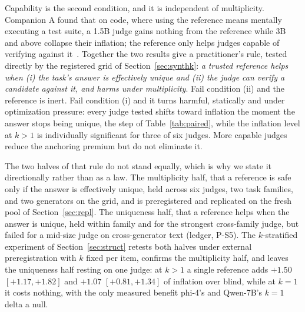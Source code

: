 \documentclass[11pt]{article}
\begin{document}
Capability is the second condition, and it is independent of multiplicity.
Companion A found that on code, where using the reference means mentally executing a test suite, a 1.5B judge gains nothing from the reference while 3B and above collapse their inflation; the reference only helps judges capable of verifying against it~\cite{companionA}.
Together the two results give a practitioner's rule, tested directly by the registered grid of Section~\ref{sec:synthk}: \emph{a trusted reference helps when (i) the task's answer is effectively unique and (ii) the judge can verify a candidate against it, and harms under multiplicity}.
Fail condition (ii) and the reference is inert.
Fail condition (i) and it turns harmful, statically and under optimization pressure: every judge tested shifts toward inflation the moment the answer stops being unique, the step of Table~\ref{tab:paired}, while the inflation level at $k > 1$ is individually significant for three of six judges.
More capable judges reduce the anchoring premium but do not eliminate it.

The two halves of that rule do not stand equally, which is why we state it directionally rather than as a law.
The multiplicity half, that a reference is safe only if the answer is effectively unique, held across six judges, two task families, and two generators on the grid, and is preregistered and replicated on the fresh pool of Section~\ref{sec:repl}.
The uniqueness half, that a reference helps when the answer is unique, held within family and for the strongest cross-family judge, but failed for a mid-size judge on cross-generator text (ledger, P-S5).
The $k$-stratified experiment of Section~\ref{sec:struct} retests both halves under external preregistration with $k$ fixed per item, confirms the multiplicity half, and leaves the uniqueness half resting on one judge: at $k > 1$ a single reference adds $+1.50$ $[+1.17, +1.82]$ and $+1.07$ $[+0.81, +1.34]$ of inflation over blind, while at $k{=}1$ it costs nothing, with the only measured benefit phi-4's and Qwen-7B's $k{=}1$ delta a null.
\end{document}
